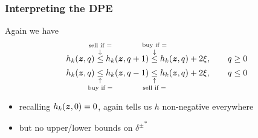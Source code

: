 \begin{frame}
\frametitle{Interpreting the DPE}
Again we have
\[ h_k(\bz,q) \overset{\text{\makebox[0pt]{sell if =}}}{\overset{\downarrow}{\leq}} h_k(\bz,q+1) \overset{\text{\makebox[0pt]{buy if =}}}{\overset{\downarrow}{\leq}} h_k(\bz,q) + 2\xi, \qquad q \geq 0 \]
\[ h_k(\bz,q) \underset{\text{\makebox[0pt]{buy if =}}}{\underset{\uparrow}{\leq}} h_k(\bz,q-1) \underset{\text{\makebox[0pt]{sell if =}}}{\underset{\uparrow}{\leq}} h_k(\bz,q) + 2\xi, \qquad q \leq 0 \]
\begin{itemize}
\item recalling $h_k(\bm{z},0) = 0$, again tells us $h$ non-negative everywhere
\item but no upper/lower bounds on ${\delta^\pm}^*$
\end{itemize}
\end{frame}